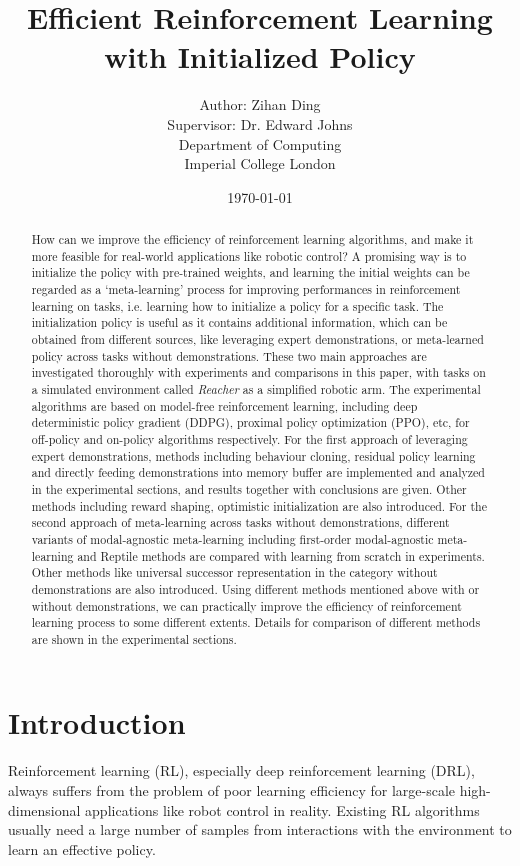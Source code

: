\documentclass{article}
\title{Efficient Reinforcement Learning with Initialized Policy}
\author{Author: Zihan Ding\\Supervisor: Dr. Edward Johns\\Department of Computing\\Imperial College London}
\date{\today}
\begin{document}
\maketitle
\newpage
\tableofcontents

\newpage
\begin{abstract}
How can we improve the efficiency of reinforcement learning algorithms, and make it more feasible for real-world applications like robotic control? A promising way is to initialize the policy with pre-trained weights, and learning the initial weights can be regarded as a `meta-learning' process for improving performances in reinforcement learning on tasks, i.e. learning how to initialize a policy for a specific task. The initialization policy is useful as it contains additional information, which can be obtained from different sources, like leveraging expert demonstrations, or meta-learned policy across tasks without demonstrations. These two main approaches are investigated thoroughly with experiments and comparisons in this paper, with tasks on a simulated environment called \textit{Reacher} as a simplified robotic arm. The experimental algorithms are based on model-free reinforcement learning, including deep deterministic policy gradient (DDPG), proximal policy optimization (PPO), etc, for off-policy and on-policy algorithms respectively. For the first approach of leveraging expert demonstrations, methods including behaviour cloning, residual policy learning and directly feeding demonstrations into memory buffer are implemented and analyzed in the experimental sections, and results together with conclusions are given. Other methods including reward shaping, optimistic initialization are also introduced. For the second approach of meta-learning across tasks without demonstrations, different variants of modal-agnostic meta-learning including first-order modal-agnostic meta-learning and Reptile methods are compared with learning from scratch in experiments. Other methods like universal successor representation in the category without demonstrations are also introduced. Using different methods mentioned above with or without demonstrations, we can practically improve the efficiency of reinforcement learning process to some different extents. Details for comparison of different methods are shown in the experimental sections.
\end{abstract}

\newpage

\section{Introduction}
Reinforcement learning (RL), especially deep reinforcement learning (DRL), always suffers from the problem of poor learning efficiency for large-scale high-dimensional applications like robot control in reality. Existing RL algorithms usually need a large number of samples from interactions with the environment to learn an effective policy. 
\end{document}
